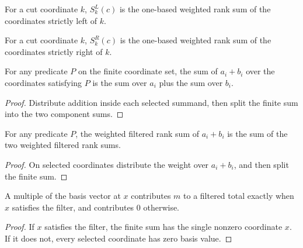 \begin{definition}

  \label{def:left_rank_sum}
  For a cut coordinate \(k\), \(S^L_k(c)\) is the one-based weighted
  rank sum of the coordinates strictly left of \(k\).
\end{definition}

\begin{definition}

  \label{def:right_rank_sum}
  For a cut coordinate \(k\), \(S^R_k(c)\) is the one-based weighted
  rank sum of the coordinates strictly right of \(k\).
\end{definition}

\begin{lemma}

  \label{lem:filtered_total_add}
  For any predicate \(P\) on the finite coordinate set, the sum of
  \(a_i+b_i\) over the coordinates satisfying \(P\) is the sum over
  \(a_i\) plus the sum over \(b_i\).
\end{lemma}
\begin{proof}

\leanok
  Distribute addition inside each selected summand, then split the finite
  sum into the two component sums.
\end{proof}

\begin{lemma}

  \label{lem:filtered_rank_add}
  For any predicate \(P\), the weighted filtered rank sum of
  \(a_i+b_i\) is the sum of the two weighted filtered rank sums.
\end{lemma}
\begin{proof}

\leanok
  On selected coordinates distribute the weight over \(a_i+b_i\), and
  then split the finite sum.
\end{proof}

\begin{lemma}

  \label{lem:filtered_total_basis}
  A multiple of the basis vector at \(x\) contributes \(m\) to a filtered
  total exactly when \(x\) satisfies the filter, and contributes \(0\)
  otherwise.
\end{lemma}
\begin{proof}

\leanok
  If \(x\) satisfies the filter, the finite sum has the single nonzero
  coordinate \(x\).  If it does not, every selected coordinate has zero
  basis value.
\end{proof}

